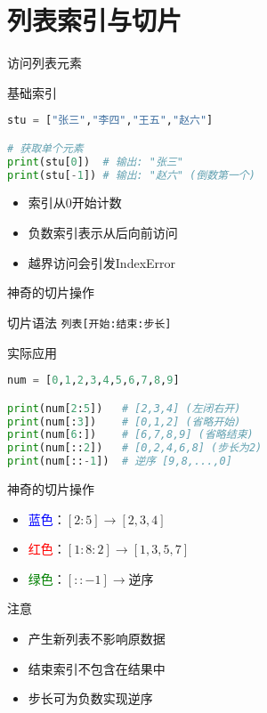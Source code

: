 \documentclass{beamer}
\begin{document}
\section{列表索引与切片}
\begin{frame}[fragile]{访问列表元素}
\begin{block}{基础索引}
\begin{lstlisting}[language=Python]
stu = ["张三","李四","王五","赵六"]

# 获取单个元素
print(stu[0])  # 输出: "张三" 
print(stu[-1]) # 输出: "赵六" (倒数第一个)
\end{lstlisting}
\begin{itemize}
\item 索引从\colorbox{cuhksz3}{0}开始计数
\item 负数索引表示\colorbox{cuhksz3}{从后向前}访问
\item 越界访问会引发\colorbox{cuhksz3}{IndexError}
\end{itemize}
\end{block}

\end{frame}

\begin{frame}[fragile]{神奇的切片操作}
\begin{block}{切片语法}
\centering
\texttt{列表[开始:结束:步长]}
\end{block}

\begin{exampleblock}{实际应用}
\begin{lstlisting}[language=Python]
num = [0,1,2,3,4,5,6,7,8,9]

print(num[2:5])   # [2,3,4] (左闭右开)
print(num[:3])    # [0,1,2] (省略开始)
print(num[6:])    # [6,7,8,9] (省略结束)
print(num[::2])   # [0,2,4,6,8] (步长为2)
print(num[::-1])  # 逆序 [9,8,...,0]
\end{lstlisting}
\end{exampleblock}
\end{frame}

\begin{frame}{神奇的切片操作}

\begin{itemize}
\item \textcolor{blue}{蓝色}：$[2:5] \to [2,3,4]$
\item \textcolor{red}{红色}：$[1:8:2] \to [1,3,5,7]$
\item \textcolor{green}{绿色}：$[::-1]  \to \text{逆序}$
\end{itemize}
\begin{alertblock}{注意}
\begin{itemize}
\item 产生\colorbox{cuhksz3}{新列表}不影响原数据
\item 结束索引\colorbox{cuhksz3}{不包含}在结果中
\item 步长可为负数实现\colorbox{cuhksz3}{逆序}
\end{itemize}
\end{alertblock}
\end{frame}
\end{document}
